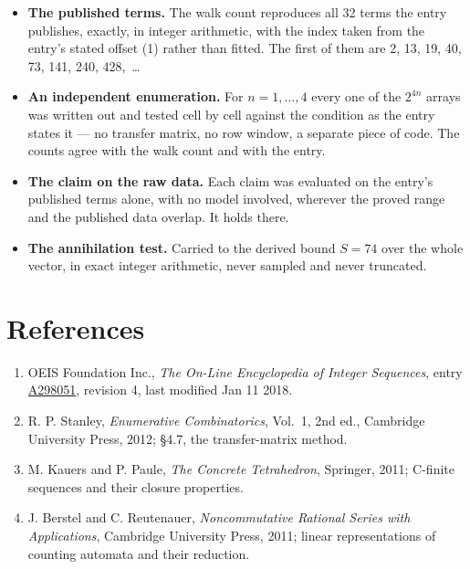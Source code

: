 \documentclass[11pt]{article}
\theoremstyle{definition}
\begin{document}
\begin{itemize}

\item {\bfseries The published terms.} The walk count reproduces all 32 terms the entry publishes, exactly, in integer arithmetic, with the index taken from the entry's stated offset (1) rather than fitted. The first of them are 2, 13, 19, 40, 73, 141, 240, 428,~\dots

\item {\bfseries An independent enumeration.} For $n = 1,\dots,4$ every one of the $2^{4n}$ arrays was written out and tested cell by cell against the condition as the entry states it --- no transfer matrix, no row window, a separate piece of code. The counts agree with the walk count and with the entry.

\item {\bfseries The claim on the raw data.} Each claim was evaluated on the entry's published terms alone, with no model involved, wherever the proved range and the published data overlap. It holds there.

\item {\bfseries The annihilation test.} Carried to the derived bound $S = 74$ over the whole vector, in exact integer arithmetic, never sampled and never truncated.

\end{itemize}

\section{References}

\begin{enumerate}

\item OEIS Foundation Inc., \emph{The On-Line Encyclopedia of Integer Sequences}, entry \href{https://oeis.org/A298051}{A298051}, revision 4, last modified Jan 11 2018.

\item R. P. Stanley, \emph{Enumerative Combinatorics}, Vol.~1, 2nd ed., Cambridge University Press, 2012; \S4.7, the transfer-matrix method.

\item M. Kauers and P. Paule, \emph{The Concrete Tetrahedron}, Springer, 2011; C-finite sequences and their closure properties.

\item J. Berstel and C. Reutenauer, \emph{Noncommutative Rational Series with Applications}, Cambridge University Press, 2011; linear representations of counting automata and their reduction.

\end{enumerate}
\end{document}
